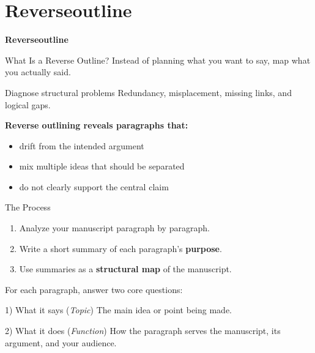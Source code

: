 \documentclass{beamer}
\begin{document}
\section{Reverseoutline}

\begin{frame}
  \centering
  \vfill
  {\Large\bfseries Reverseoutline}
  \vfill
\end{frame}



\begin{frame}{What Is a Reverse Outline?}
  Instead of planning what you want to say, map what you actually said.

  \medskip
  \begin{block}{Diagnose structural problems}
    Redundancy, misplacement, missing links, and logical gaps.
  \end{block}

  \medskip
  \textbf{Reverse outlining reveals paragraphs that:}
  \begin{itemize}
    \item drift from the intended argument
    \item mix multiple ideas that should be separated
    \item do not clearly support the central claim
  \end{itemize}

 \end{frame}

\begin{frame}{The Process}

  \begin{enumerate}
    \item Analyze your manuscript paragraph by paragraph.
    \item Write a short summary of each paragraph's \textbf{purpose}.
    \item Use summaries as a \textbf{structural map} of the manuscript.
  \end{enumerate}
  
  \medskip

  For each paragraph, answer two core questions:

  \medskip
  \begin{block}{1) What it says (\emph{Topic})}
    The main idea or point being made.
  \end{block}

  \begin{block}{2) What it does (\emph{Function})}
    How the paragraph serves the manuscript, its argument, and your audience.
  \end{block}

\end{frame}
\end{document}
